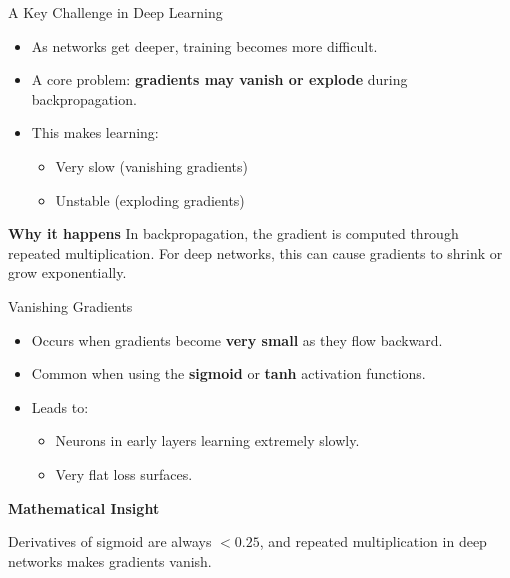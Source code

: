 \documentclass[aspectratio=169]{beamer}
\begin{document}
\begin{frame}{A Key Challenge in Deep Learning}

\begin{itemize}
    \item As networks get deeper, training becomes more difficult.
    \item A core problem: \textbf{gradients may vanish or explode} during backpropagation.
    \item This makes learning:
    \begin{itemize}
        \item Very slow (vanishing gradients)
        \item Unstable (exploding gradients)
    \end{itemize}
\end{itemize}

\vspace{0.3cm}
\begin{block}{\textbf{Why it happens}}
In backpropagation, the gradient is computed through repeated multiplication.
For deep networks, this can cause gradients to shrink or grow exponentially.
\end{block}

\end{frame}
%
%
\begin{frame}{Vanishing Gradients}

\begin{itemize}
    \item Occurs when gradients become \textbf{very small} as they flow backward.
    \item Common when using the \textbf{sigmoid} or \textbf{tanh} activation functions.
    \item Leads to:
    \begin{itemize}
        \item Neurons in early layers learning extremely slowly.
        \item Very flat loss surfaces.
    \end{itemize}
\end{itemize}

\vspace{0.3cm}
\textbf{Mathematical Insight}
\begin{block}{}
Derivatives of sigmoid are always \( < 0.25 \), and repeated multiplication in deep networks makes gradients vanish.
\end{block}

\end{frame}
\end{document}
